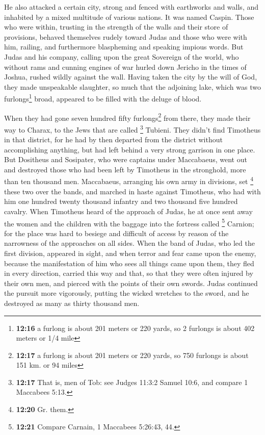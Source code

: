  He also attacked a certain city, strong and fenced with
earthworks and walls, and inhabited by a mixed multitude of various
nations. It was named Caspin.  Those who were within,
trusting in the strength of the walls and their store of provisions,
behaved themselves rudely toward Judas and those who were with him,
railing, and furthermore blaspheming and speaking impious words.
 But Judas and his company, calling upon the great
Sovereign of the world, who without rams and cunning engines of war
hurled down Jericho in the times of Joshua, rushed wildly against the
wall.  Having taken the city by the will of God, they
made unspeakable slaughter, so much that the adjoining lake, which was
two furlongs\footnote{\textbf{12:16} a furlong is about 201 meters or
  220 yards, so 2 furlongs is about 402 meters or 1/4 mile} broad,
appeared to be filled with the deluge of blood.

 When they had gone seven hundred fifty
furlongs\footnote{\textbf{12:17} a furlong is about 201 meters or 220
  yards, so 750 furlongs is about 151 km. or 94 miles} from there, they
made their way to Charax, to the Jews that are called \footnote{\textbf{12:17}
  That is, men of Tob: see Judges 11:3:2 Samuel 10:6, and compare 1
  Maccabees 5:13.} Tubieni.  They didn't find Timotheus
in that district, for he had by then departed from the district without
accomplishing anything, but had left behind a very strong garrison in
one place.  But Dositheus and Sosipater, who were
captains under Maccabaeus, went out and destroyed those who had been
left by Timotheus in the stronghold, more than ten thousand men.
 Maccabaeus, arranging his own army in divisions, set
\footnote{\textbf{12:20} Gr. them.} these two over the bands, and
marched in haste against Timotheus, who had with him one hundred twenty
thousand infantry and two thousand five hundred cavalry. 
When Timotheus heard of the approach of Judas, he at once sent away the
women and the children with the baggage into the fortress called
\footnote{\textbf{12:21} Compare Carnain, 1 Maccabees 5:26:43, 44.}
Carnion; for the place was hard to besiege and difficult of access by
reason of the narrowness of the approaches on all sides. 
When the band of Judas, who led the first division, appeared in sight,
and when terror and fear came upon the enemy, because the manifestation
of him who sees all things came upon them, they fled in every direction,
carried this way and that, so that they were often injured by their own
men, and pierced with the points of their own swords. 
Judas continued the pursuit more vigorously, putting the wicked wretches
to the sword, and he destroyed as many as thirty thousand men.

